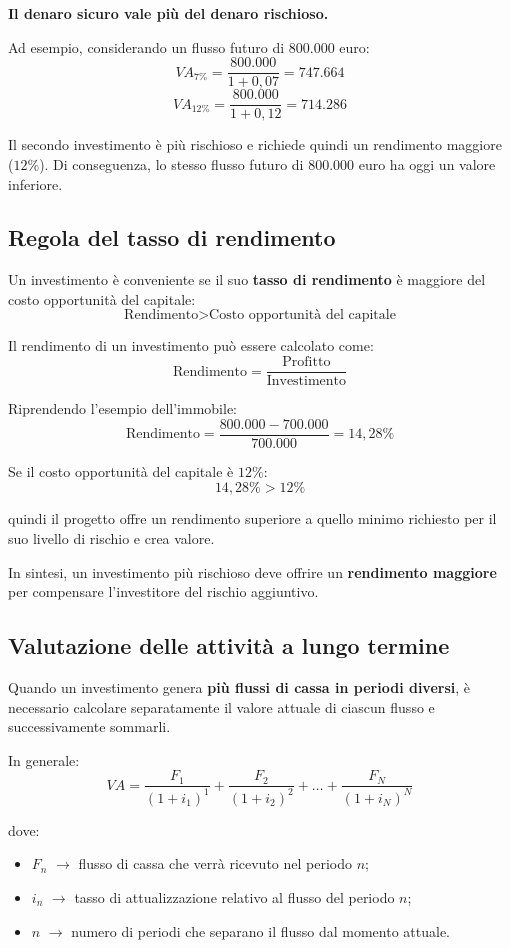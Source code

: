 \begin{center}
    \textbf{Il denaro sicuro vale più del denaro rischioso.}
\end{center}

\noindent Ad esempio, considerando un flusso futuro di \(800.000\) euro:
\[
VA_{7\%} = \frac{800.000}{1+0{,}07} = 747.664
\]
\[
VA_{12\%} = \frac{800.000}{1+0{,}12} = 714.286
\]

\noindent Il secondo investimento è più rischioso e richiede quindi un rendimento maggiore (\(12\%\)). 
Di conseguenza, lo stesso flusso futuro di \(800.000\) euro ha oggi un valore inferiore.

\subsection{Regola del tasso di rendimento}
Un investimento è conveniente se il suo \textbf{tasso di rendimento} è maggiore del costo opportunità del capitale:
\[
\text{Rendimento} > \text{Costo opportunità del capitale}
\]

\noindent Il rendimento di un investimento può essere calcolato come:
\[
\text{Rendimento} = \frac{\text{Profitto}}{\text{Investimento}}
\]

\noindent Riprendendo l'esempio dell'immobile:
\[
\text{Rendimento} =
\frac{800.000-700.000}{700.000}
= 14{,}28\%
\]

\noindent Se il costo opportunità del capitale è \(12\%\):
\[
14{,}28\% > 12\%
\]

\noindent quindi il progetto offre un rendimento superiore a quello minimo 
richiesto per il suo livello di rischio e crea valore.

\noindent In sintesi, un investimento più rischioso deve offrire un \textbf{rendimento maggiore} 
per compensare l'investitore del rischio aggiuntivo.

\subsection{Valutazione delle attività a lungo termine}
Quando un investimento genera \textbf{più flussi di cassa in periodi diversi}, è necessario calcolare separatamente il valore attuale di ciascun flusso e successivamente sommarli.

\noindent In generale:
\[
VA = \frac{F_1}{(1+i_1)^1}
   + \frac{F_2}{(1+i_2)^2}
   + \dots
   + \frac{F_N}{(1+i_N)^N}
\]

\noindent dove:
\begin{itemize}
    \item \(F_n\) $\rightarrow$ flusso di cassa che verrà ricevuto nel periodo \(n\);
    \item \(i_n\) $\rightarrow$ tasso di attualizzazione relativo al flusso del periodo \(n\);
    \item \(n\) $\rightarrow$ numero di periodi che separano il flusso dal momento attuale.
\end{itemize}

